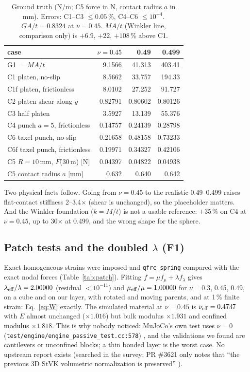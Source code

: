 \documentclass[10pt,twocolumn]{article}
\newcommand{\code}[1]{\texttt{\small #1}}
\newcommand{\src}[1]{\texttt{\footnotesize #1}}
\newcommand{\Nu}{N/\textmu m}
\newcommand{\um}{\,\textmu m}
\begin{document}
\begin{table}[t]\centering\footnotesize
\caption{Ground truth (\Nu; C5 force in N, contact radius $a$ in mm). Errors: C1--C3 $\le0.05$\,\%, C4--C6
$\le10^{-4}$. $GA/t=0.8324$ at $\nu=0.45$. $MA/t$ (Winkler line, comparison only) is $+6.9$, $+22$, $+108$\,\% above C1.}
\label{tab:gt}
\begin{tabular}{@{}lrrr@{}}\toprule
case & $\nu=0.45$ & 0.49 & 0.499\\\midrule
G1 $=MA/t$ & 9.1566 & 41.313 & 403.41\\
C1 platen, no-slip & 8.5662 & 33.757 & 194.33\\
C1f platen, frictionless & 8.0102 & 27.252 & 91.727\\
C2 platen shear along $y$ & 0.82791 & 0.80602 & 0.80126\\
C3 half platen & 3.5927 & 13.139 & 55.376\\
C4 punch $a=5$, frictionless & 0.14757 & 0.24139 & 0.28798\\
C6 taxel punch, no-slip & 0.21658 & 0.48158 & 0.73233\\
C6f taxel punch, frictionless & 0.19971 & 0.34327 & 0.42106\\
C5 $R=10$\,mm, $F$(30\um) [N] & 0.04397 & 0.04822 & 0.04938\\
C5 contact radius $a$ [mm] & 0.632 & 0.640 & 0.642\\\bottomrule
\end{tabular}
\end{table}

Two physical facts follow. Going from $\nu=0.45$ to the realistic 0.49--0.499 raises flat-contact stiffness 2--3.4$\times$
(shear is unchanged), so the placeholder matters. And the Winkler foundation ($k=M/t$) is not a usable reference:
$+35$\,\% on C4 at $\nu=0.45$, up to 30$\times$ at 0.499, and the wrong shape for the sphere.

\subsection{Patch tests and the doubled \texorpdfstring{$\lambda$}{lambda} (F1)}
\label{sec:patch}
Exact homogeneous strains were imposed and \code{qfrc\_spring} compared with the exact nodal forces
(Table~\ref{tab:patch}). Fitting $f=\mu f_\mu+\lambda f_\lambda$ gives $\lambda_{\rm eff}/\lambda=2.00000$ (residual
$<10^{-11}$) and $\mu_{\rm eff}/\mu=1.00000$ for $\nu=0.3$, 0.45, 0.49, on a cube and on our layer, with rotated and
moving parents, and at 1\,\% finite strain: Eq.~\eqref{eq:W} exactly. The simulated material at $\nu=0.45$ is
$\nu_{\rm eff}=0.4737$ with $E$ almost unchanged ($\times1.016$) but bulk modulus $\times1.931$ and confined modulus
$\times1.818$. This is why nobody noticed: MuJoCo's own test uses $\nu=0$
(\src{test/engine/engine\_passive\_test.cc:578}) \cite{mjtest}, and the validations we found are cantilevers or
unconfined blocks; a thin bonded layer is the worst case. No upstream report exists (searched in the survey;
PR \#3621 only notes that ``the previous 3D StVK volumetric normalization is preserved'' \cite{pr3621}).
\end{document}

